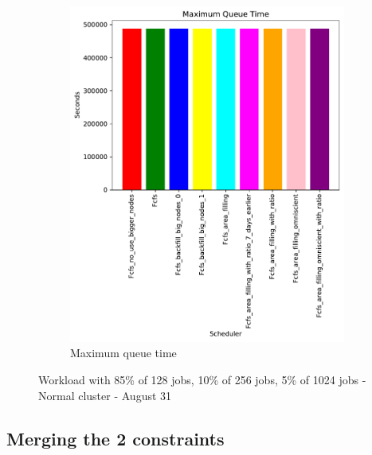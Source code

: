 \documentclass[a4paper]{article}
\begin{document}
\begin{figure}[H]
\begin{subfigure}[b]{0.4\linewidth}\centering\includegraphics[width=0.95\linewidth]{MBSS/plot/Size_Constraint_2022-01-17->2022-01-17_V85105_Maximum_queue_time_450_128_32_256_4_1024.pdf}\caption{Maximum queue time}\label{45}\end{subfigure}
\caption{Workload with 85\% of 128 jobs, 10\% of 256 jobs, 5\% of 1024 jobs - Normal cluster - August 31}\label{49}\end{figure}

\subsection{Merging the 2 constraints}

\end{document}
